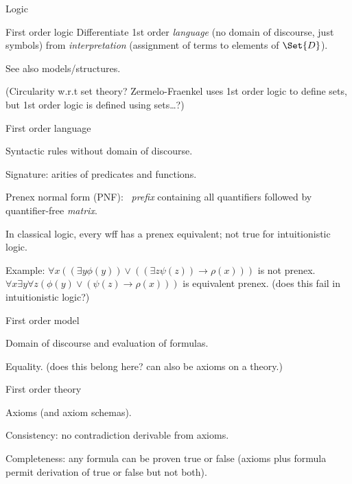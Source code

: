 \begin{plSection}{Logic}
\begin{plSection}{First order logic}
Differentiate 1st order \textit{language} 
(no domain of discourse, just symbols)
from \textit{interpretation} 
(assignment of terms to elements of $\Set{D}$).

See also models/structures.~

(Circularity w.r.t set theory?
Zermelo-Fraenkel uses 1st order logic to define sets,
but 1st order logic is defined using sets\ldots?)

\begin{plSection}{First order language}
\label{sec:First_order_language}

Syntactic rules without domain of discourse.

Signature: arities of predicates and functions.

Prenex normal form (PNF):~ 
\textit{prefix} containing all quantifiers 
followed by quantifier-free \textit{matrix}.

In classical logic, every wff has a prenex equivalent;
not true for intuitionistic logic.

Example:
$\forall x 
((\exists y\phi (y))
\lor 
((\exists z\psi (z))\rightarrow \rho (x)))$ is not prenex.
$\forall x\exists y\forall z
(\phi (y)\lor (\psi (z)\rightarrow \rho (x)))$ 
is equivalent prenex. 
(does this fail in intuitionistic logic?)

\end{plSection}%
\begin{plSection}{First order model}
\label{sec:First_order_model}

Domain of discourse and evaluation of formulas.

Equality.
(does this belong here? can also be axioms on a theory.)

\end{plSection}%
\begin{plSection}{First order theory}
\label{sec:First_order_theory}

Axioms (and axiom schemas).~

Consistency: no contradiction derivable from axioms.

Completeness: any formula can be proven 
\textsf{true} or \textsf{false} 
(axioms plus formula permit derivation of 
\textsf{true} or \textsf{false} but not both).


\end{plSection}
\end{plSection}
\end{plSection}
